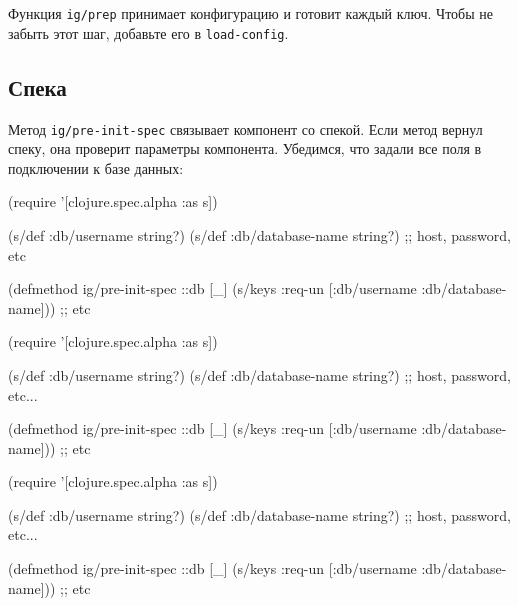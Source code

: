 \fi

Функция \verb|ig/prep| принимает конфигурацию и готовит каждый ключ. Чтобы не
забыть этот шаг, добавьте его в \verb|load-config|.

\subsection{Спека}


Метод \verb|ig/pre-init-spec| связывает компонент со спекой. Если метод вернул
спеку, она проверит параметры компонента. Убедимся, что задали все поля в
подключении к базе данных:

\ifnarrow

\begin{english}
  \begin{clojure}
(require '[clojure.spec.alpha :as s])

(s/def :db/username string?)
(s/def :db/database-name string?)
;; host, password, etc

(defmethod ig/pre-init-spec ::db [_]
  (s/keys :req-un [:db/username
                   :db/database-name]))
                   ;; etc
  \end{clojure}
\end{english}

\else

\ifafive

\begin{english}
  \begin{clojure}
(require '[clojure.spec.alpha :as s])

(s/def :db/username string?)
(s/def :db/database-name string?)
;; host, password, etc...
  \end{clojure}
\end{english}

\pagebreak[4]

\begin{english}
  \begin{clojure}
(defmethod ig/pre-init-spec ::db [_]
  (s/keys :req-un [:db/username
                   :db/database-name])) ;; etc
  \end{clojure}
\end{english}

\else

\begin{english}
  \begin{clojure}
(require '[clojure.spec.alpha :as s])

(s/def :db/username string?)
(s/def :db/database-name string?)
;; host, password, etc...

(defmethod ig/pre-init-spec ::db [_]
  (s/keys :req-un [:db/username
                   :db/database-name])) ;; etc
  \end{clojure}
\end{english}

